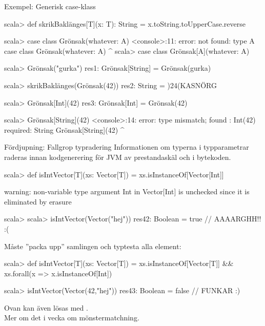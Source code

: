 \begin{Slide}{Exempel: Generisk case-klass}
\vspace{-0.5em}\begin{REPL}
scala> def skrikBaklänges[T](x: T): String = x.toString.toUpperCase.reverse

scala> case class Grönsak(whatever: A)
<console>:11: error: not found: type A
       case class Grönsak(whatever: A)
                                    ^
scala> case class Grönsak[A](whatever: A)

scala> Grönsak("gurka")
res1: Grönsak[String] = Grönsak(gurka)

scala> skrikBaklänges(Grönsak(42))
res2: String = )24(KASNÖRG

scala> Grönsak[Int](42)
res3: Grönsak[Int] = Grönsak(42)

scala> Grönsak[String](42)
<console>:14: error: type mismatch;
 found   : Int(42)
 required: String
       Grönsak[String](42)
                       ^
\end{REPL}
\end{Slide}




\ifkompendium\else


\begin{Slide}{Fördjupning: Fallgrop typradering }\SlideFontSmall
Informationen om typerna i typparametrar raderas innan kodgenerering för JVM av prestandaskäl och  i bytekoden.
\vspace{-0.25em}\begin{REPL}
scala> def isIntVector[T](xs: Vector[T]) = xs.isInstanceOf[Vector[Int]]

warning: non-variable type argument Int in Vector[Int]
is unchecked since it is eliminated by erasure

scala> scala> isIntVector(Vector("hej"))
res42: Boolean = true  // AAAARGHH!! :(
\end{REPL}
Måste ''packa upp'' samlingen och typtesta alla element:
\begin{REPL}
scala> def isIntVector[T](xs: Vector[T]) =
         xs.isInstanceOf[Vector[T]] && xs.forall(x => x.isInstanceOf[Int])

scala> isIntVector(Vector(42,"hej"))
res43: Boolean = false  // FUNKAR :)

\end{REPL}
Ovan kan även lösas med .\\Mer om det i vecka  om mönstermatchning.

\end{Slide}



